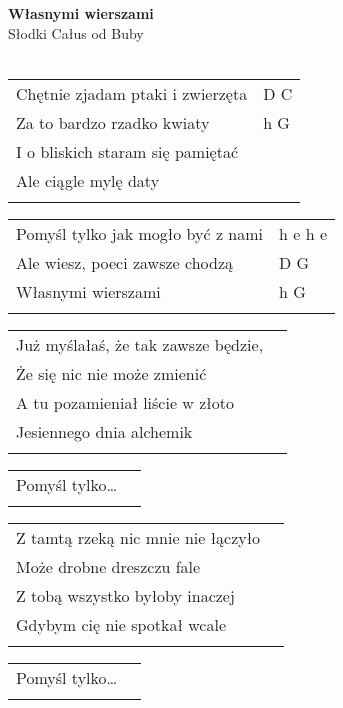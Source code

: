 \documentclass[a5paper]{article}
\begin{document}


\noindent
\fontsize{12pt}{15pt}\selectfont
\textbf{Własnymi wierszami} \\
\fontsize{8pt}{10pt}\selectfont
Słodki Całus od Buby \\ \\
\fontsize{10pt}{12pt}\selectfont
{}
\begin{tabular}{@{}p{7.50cm}p{3cm}@{}}
\noindent
Chętnie zjadam ptaki i zwierzęta & D C \\
Za to bardzo rzadko kwiaty & h G \\
I o bliskich staram się pamiętać \\
Ale ciągle mylę daty \\ \\
\end{tabular}

\noindent
\begin{tabular}{@{}p{6.50cm}p{3cm}@{}}
Pomyśl tylko jak mogło być z nami & h e h e \\
Ale wiesz, poeci zawsze chodzą & D G \\
Własnymi wierszami & h G \\ \\
\end{tabular}

\noindent
\begin{tabular}{@{}p{6.50cm}p{3cm}@{}}
Już myślałaś, że tak zawsze będzie, \\
Że się nic nie może zmienić \\
A tu pozamieniał liście w złoto \\
Jesiennego dnia alchemik \\ \\
\end{tabular}

\noindent
\begin{tabular}{@{}p{6.50cm}p{3cm}@{}}
Pomyśl tylko… \\ \\
\end{tabular}

\noindent
\begin{tabular}{@{}p{6.50cm}p{3cm}@{}}
Z tamtą rzeką nic mnie nie łączyło \\
Może drobne dreszczu fale \\
Z tobą wszystko byłoby inaczej \\
Gdybym cię nie spotkał wcale \\ \\
\end{tabular}

\noindent
\begin{tabular}{@{}p{6.50cm}p{3cm}@{}}
Pomyśl tylko… \\ \\
\end{tabular}
\end{document}
